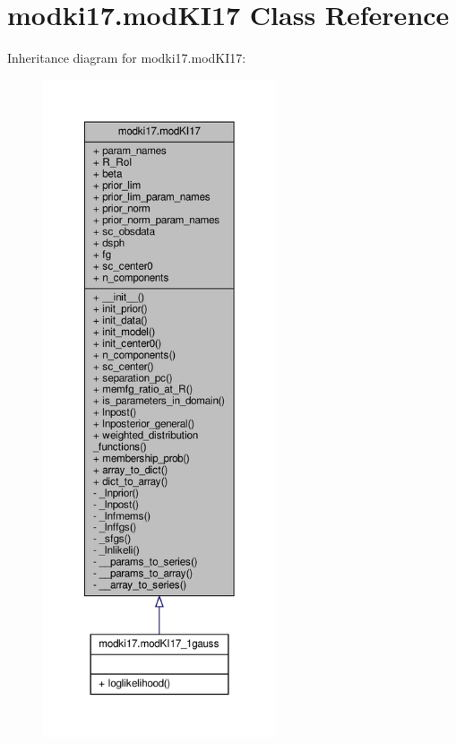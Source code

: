 \hypertarget{classmodki17_1_1modKI17}{}\section{modki17.\+mod\+K\+I17 Class Reference}
\label{classmodki17_1_1modKI17}


Inheritance diagram for modki17.\+mod\+K\+I17\+:\nopagebreak
\begin{figure}[H]
\begin{center}
\leavevmode
\includegraphics[height=550pt]{d2/d1c/classmodki17_1_1modKI17__inherit__graph}
\end{center}
\end{figure}


